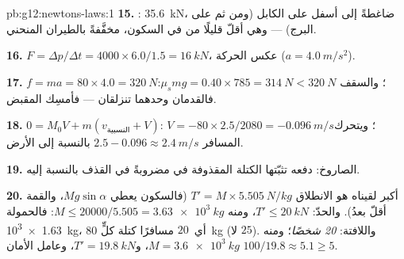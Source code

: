 \begin{solution}{pb:g12:newtons-laws:1}
\textbf{15.} : \qty{35.6}{kN}، ضاغطةً إلى أسفل على
الكابل (ومن ثم على البرج) --- وهي أقلّ قليلًا من  في السكون،
مخفَّفةً بالطيران المنحني.

\textbf{16.} $F = \Delta p/\Delta t = 4000 \times 6.0/1.5 =
\qty{16}{kN}$، عكس الحركة ($a = \qty{4.0}{m/s^2}$).

\textbf{17.} $f = ma = 80 \times 4.0 = \qty{320}{N}$؛ والسقف
$\mu_s mg = 0.40 \times 785 = \qty{314}{N} < \qty{320}{N}$: فالقدمان
وحدهما تنزلقان --- فأمسِك المقبض.

\textbf{18.} $0 = M_0 V + m(v_{\text{النسبية}} + V)$:
$V = -80 \times 2.5/2080 = \qty{-0.096}{m/s}$؛ ويتحرك المسافر 
$2.5 - 0.096 \approx \qty{2.4}{m/s}$ بالنسبة إلى الأرض.

\textbf{19.} الصاروخ:  دفعه تثبّتها الكتلة المقذوفة في
 مضروبةً في  القذف بالنسبة إليه.

\textbf{20.} أكبر  لقيناه هو  الانطلاق
$T' = M \times \qty{5.505}{N/kg}$ (فالسكون يعطي $Mg\sin\alpha$، والقمة أقلّ بعدُ). والحدّ: $T' \leq \qty{20}{kN}$، ومنه
$M \leq 20000/5.505 = \qty{3.63e3}{kg}$: فالحمولة
\qty{1.63e3}{kg}، أي\ $20$ مسافرًا كتلة كلٍّ \qty{80}{kg} (لا $25$).
واللافتة: \emph{20 شخصًا}؛ ومنه $M = \qty{3.6e3}{kg}$،
و$T' = \qty{19.8}{kN}$، وعامل الأمان $100/19.8 \approx 5.1 \geq 5$.
\end{solution}
